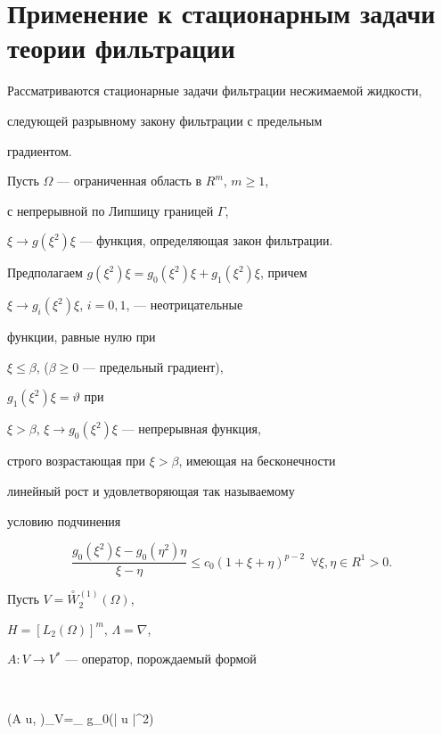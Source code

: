 \section{Применение к стационарным задачи теории фильтрации}





Рассматриваются стационарные задачи фильтрации несжимаемой жидкости, 


следующей разрывному закону фильтрации с предельным 


градиентом.





Пусть $\Omega$ --- ограниченная область в $R^{m}$, $m \geq 1$,


с непрерывной по Липшицу  границей $\Gamma$, \linebreak


$\xi \to g(\xi^{2})\xi$ --- функция, определяющая закон фильтрации. 


Предполагаем $g(\xi^{2})\xi=g_0(\xi^{2})\xi+g_1(\xi^{2})\xi$, причем 


$\xi \to g_i(\xi^{2})\xi$, $i=0,1$, --- неотрицательные 


функции, равные нулю при 


$\xi \leq \beta$, ($\beta \geq 0$ --- предельный градиент), 


$g_1(\xi^{2})\xi=\vartheta$ при


$\xi > \beta $, $\xi \to g_0(\xi^{2})\xi$ --- непрерывная функция, 


строго возрастающая при $\xi > \beta$, имеющая на бесконечности


линейный рост и удовлетворяющая так называемому


условию подчинения


$$ 


\frac{g_0(\xi^{2})\xi -g_0(\eta^{2})\eta} 


{\xi-\eta} \le c_{0}(1+\xi+\eta)^{p-2} \ \ \forall


\xi, \eta \in R^{1} > 0.


$$


Пусть $V=\overset{\circ} W{}^{(1)}_2 (\Omega)$, 


$H=[{L_2 (\Omega)}]^m$, $\Lambda=\nabla$, 


$A: V \to V^*$ --- оператор, порождаемый формой


$$


(A u, \eta)_V=\int_{\Omega} g_0(| \nabla u |^2)


